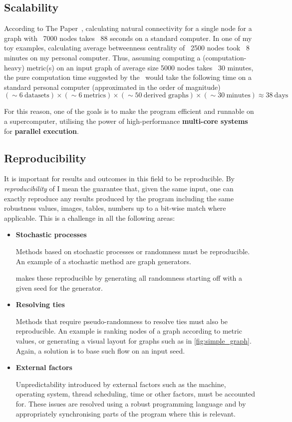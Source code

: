 \subsection{Scalability}

According to The Paper~\cite{Bozhilova2019}, calculating natural connectivity for a single node for a graph with ~7000 nodes takes ~88 seconds on a standard computer.
In one of my toy examples, calculating average betweenness centrality of ~2500 nodes took ~8 minutes on my personal computer.
Thus, assuming computing a (computation-heavy) metric(s) on an input graph of average size 5000 nodes takes ~30 minutes, the pure computation time suggested by the~ would take the following time on a standard personal computer (approximated in the order of magnitude)
\[(\sim 6\ \text{datasets}) \times (\sim 6\ \text{metrics}) \times (\sim 50\ \text{derived graphs}) \times (\sim 30\ \text{minutes}) \approx 38\ \text{days}\]

For this reason, one of the goals is to make the program efficient and runnable on a supercomputer, utilising the power of high-performance \textbf{multi-core systems} for \textbf{parallel execution}.

\subsection{Reproducibility}\label{sec:reproducibility}

It is important for results and outcomes in this field to be reproducible.
By \textsl{reproducibility} of \graffs I mean the guarantee that, given the same input, one can exactly reproduce any results produced by the program including the same robustness values, images, tables, numbers up to a bit-wise match where applicable.
This is a challenge in all the following areas:
\begin{itemize}
    \item \textbf{Stochastic processes}

    Methods based on stochastic processes or randomness must be reproducible.
    An example of a stochastic method are graph generators.

    \graffs makes these reproducible by generating all randomness starting off with a given seed for the generator.

    \item \textbf{Resolving ties}

    Methods that require pseudo-randomness to resolve ties must also be reproducible.
    An example is ranking nodes of a graph according to metric values, or generating a visual layout for graphs such as in \autoref{fig:simple_graph}.
    Again, a solution is to base such flow on an input seed.

    \item \textbf{External factors}

    Unpredictability introduced by external factors such as the machine, operating system, thread scheduling, time or other factors, must be accounted for.
    These issues are resolved using a robust programming language and by appropriately synchronising parts of the program where this is relevant.
\end{itemize}

